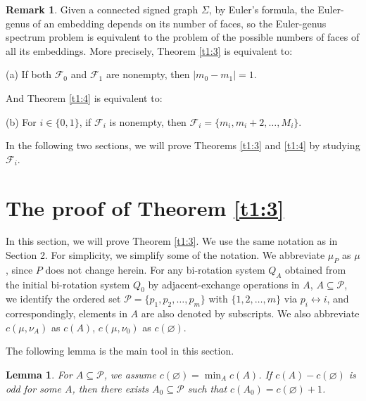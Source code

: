 \documentclass[12pt]{article}
\newtheorem{lemma}[theorem]{Lemma}
\theoremstyle{definition}
\newtheorem{remark}[theorem]{Remark}
\begin{document}
\begin{remark}\label{re2:16}
Given a connected signed graph $\Sigma$, by Euler's formula, the Euler-genus of an embedding depends on its number of faces, so the Euler-genus spectrum problem is equivalent to the problem of the possible numbers of faces of all its embeddings. More precisely, Theorem \ref{t1:3} is equivalent to:
\begin{center}
(a) If both $\mathcal F_0$ and $\mathcal F_1$ are nonempty, then $|m_0-m_1|=1.$
\end{center}
And Theorem \ref{t1:4} is equivalent to:
\begin{center}
(b) For $i\in\{0,1\}$, if $\mathcal F_i$ is nonempty, then $\mathcal F_i=\{m_i, m_i+2, \ldots, M_i\}$.\end{center}
In the following two sections, we will prove Theorems \ref{t1:3} and \ref{t1:4} by studying $\mathcal F_i$.
\end{remark}


\section{The proof of  Theorem \ref{t1:3}}\label{Sec:3}
In this section, we will prove Theorem \ref{t1:3}. We use the same notation as in Section 2. For simplicity, we simplify some of the notation. We abbreviate $\mu_P$ as $\mu$, since $P$ does not change herein. For any bi-rotation system $Q_A$ obtained from the initial bi-rotation system $Q_0$ by adjacent-exchange operations in $A$, $A\subseteq\mathcal P$, we identify the ordered set $\mathcal P=\{p_1,p_2,\ldots,p_m\}$ with $\{1,2,\ldots,m\}$ via $p_i\leftrightarrow i$,
and correspondingly, elements in
$A$ are also denoted by subscripts.
We also abbreviate $c(\mu,\nu_A)$ as $c(A)$, $c(\mu,\nu_0)$ as $c(\varnothing)$.

The following lemma is the main tool in this section.

\begin{lemma}
\label{lem3:1}
For $A\subseteq \mathcal P$, we assume $c(\varnothing)=\min_A c(A)$. If $c(A)-c(\varnothing)$ is odd for some $A$, then there exists $A_0\subseteq\mathcal P$ such that $c(A_0)=c(\varnothing)+1$.
\end{lemma}
\end{document}
